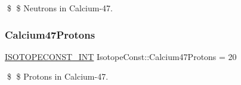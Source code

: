 \$ \$ Neutrons in Calcium-\/47. \mbox{\label{group___isotope_const-_calcium-_ca47_ga7eff2d889d7f385ea3b2b150e07c308e}} 
\subsubsection{\texorpdfstring{Calcium47\+Protons}{Calcium47Protons}}
{\footnotesize\ttfamily \mbox{\hyperlink{group___isotope_const-_macros_ga5f18360b3e99483a35c32d789e62621c}{I\+S\+O\+T\+O\+P\+E\+C\+O\+N\+S\+T\+\_\+\+I\+NT}} Isotope\+Const\+::\+Calcium47\+Protons = 20}

\$ \$ Protons in Calcium-\/47. 